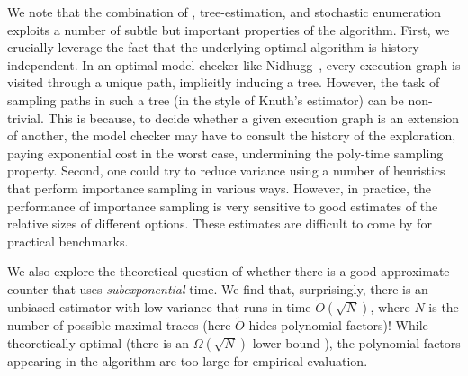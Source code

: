 We note that the combination of \trust, tree-estimation, and stochastic enumeration exploits a number of subtle but important properties of the \trust algorithm.
First, we crucially leverage the fact that the underlying optimal \dpor algorithm is history independent.
In an optimal model checker like Nidhugg~\cite{nidhugg}, every execution graph is visited through a unique path, implicitly inducing a tree.
However, the task of sampling paths in such a tree (in the style of Knuth's estimator) can be non-trivial.
This is because, to decide whether a given execution graph is an extension of another, the model checker may have to consult the history of the exploration, 
 paying exponential cost in the worst case, undermining the poly-time sampling property.
Second, one could try to reduce variance using a number of heuristics that perform importance sampling in various ways.
However, in practice, the performance of importance sampling is very sensitive to good estimates of the relative sizes of different options.
These estimates are difficult to come by for practical benchmarks.

We also explore the theoretical question of whether there is a good approximate counter that uses \emph{subexponential} time.
We find that, surprisingly, there is an unbiased estimator with low variance that runs in time \(\tilde{O}(\sqrt{N})\), where \(N\) is the number of possible maximal traces (here $\tilde{O}$ hides polynomial factors)!
While theoretically optimal (there is an \(\Omega(\sqrt{N})\) lower bound \cite{Stockmeyer85}), the polynomial factors appearing in the algorithm are too large for empirical evaluation.


